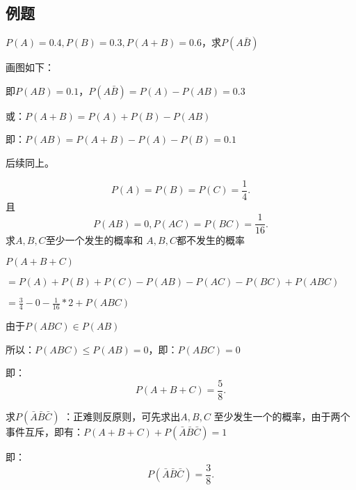 \subsection{例题}%
\label{sub:例题}
\begin{eg}
    $P\left( A \right) =0.4,P\left( B \right) =0.3,P\left( A+B \right)=0.6 $，求$P\left( A\bar{B} \right) $ 

    画图如下：
    \begin{center}
    \end{center}
    
    即$P\left( AB \right) =0.1$，$P\left( A\bar{B} \right) = P\left( A \right) -P\left( AB \right) =0.3$

    或：$P\left( A+B \right) =P\left( A \right) +P\left( B \right) -P\left( AB \right) $ 

    即：$P\left( AB \right) =P\left( A+B \right) -P\left( A \right) -P\left( B \right) =0.1$ 

    后续同上。
\end{eg}
\begin{eg}
    \[
        P\left( A \right) =P\left( B \right) =P\left( C \right) =\frac{1}{4}
    .\] 且\[
        P\left( AB \right) =0,P\left( AC \right) =P\left( BC \right) =\frac{1}{16}
    .\] 求$A,B,C$至少一个发生的概率和 $A,B,C$都不发生的概率
    
    $P\left( A+B+C \right) $

    $=P\left( A \right) +P\left( B \right) +P\left( C \right) -P\left( AB \right) -P\left( AC \right) -P\left( BC \right) +P\left( ABC \right)$

    ${=\frac{3}{4}-0-\frac{1}{16}*2+P\left( ABC \right) }$
     
    由于$P\left( ABC \right) \in P\left( AB \right) $ 

    所以：$P\left( ABC \right) \le P\left( AB \right) =0$，即：$P\left( ABC \right) =0$ 

    即：\[
        P\left( A+B+C \right) =\frac{5}{8}
    .\] 

    求$P\left( \bar{A}\bar{B}\bar{C} \right) $ ：正难则反原则，可先求出$A,B,C$ 至少发生一个的概率，由于两个事件互斥，即有：$P\left( A+B+C \right) +P\left( \bar{A}\bar{B}\bar{C} \right) =1$

    即：\[
        P\left( \bar{A}\bar{B}\bar{C} \right) =\frac{3}{8}
    .\] 

\end{eg}

